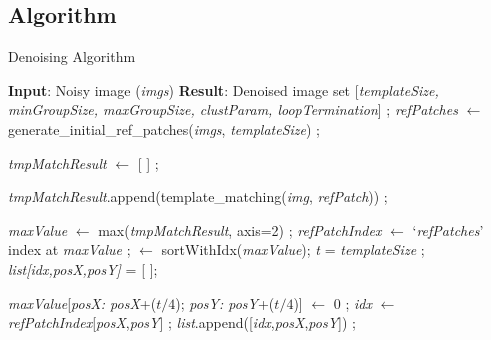 \documentclass[fleqn,10pt]{wlscirep}
\begin{document}
	\subsection*{Algorithm}
	\label{algorithms}
	
	\begin{algorithm}
		\caption{Denoising Algorithm}
		\label{algorithm:denoising_algorithm}
		\begin{algorithmic}[1]
			\State \textbf{Input}: Noisy image (\textit{imgs})
			\State \textbf{Result}: Denoised image
			\State set [\textit{templateSize, minGroupSize, maxGroupSize, clustParam, loopTermination}] ;
			\State \textit{refPatches} $\gets$ generate\_initial\_ref\_patches(\textit{imgs}, \textit{templateSize}) ;
			
			
			\State \textit{tmpMatchResult} $\gets$ [ ]	;		
			
			
			\State \textit{tmpMatchResult}.append(template\_matching(\textit{img}, \textit{refPatch})) ;
			
			\EndFor
			\EndFor
			
			\State \textit{maxValue} $\gets$ max(\textit{tmpMatchResult}, axis=2) ;
			\State \textit{refPatchIndex} $\gets$ `\textit{refPatches}' index at \textit{maxValue} ;
			 $\gets$ sortWithIdx(\textit{maxValue}); 
			\State \textit{t} = \textit{templateSize} ;
			\State \textit{list[\textit{idx},\textit{posX},\textit{posY}]} = [ ];
				
				\State \textit{maxValue}[\textit{posX: posX}+($t/4$); \textit{posY: posY}+($t/4$)] $\gets$ 0 ;
				\State \textit{idx} $\gets$ \textit{refPatchIndex}[\textit{posX},\textit{posY}] ;
				\State \textit{list}.append([\textit{idx},\textit{posX},\textit{posY}]) ;
				\EndIf
				\EndFor
				

\end{algorithmic}
\end{algorithm}
\end{document}
